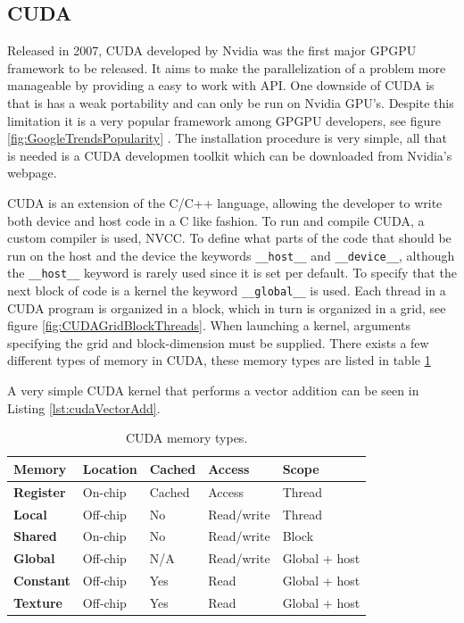 \subsection{CUDA}
Released in 2007, CUDA developed by Nvidia was the first major GPGPU framework to be released. It aims to make the parallelization of a problem more manageable by providing a easy to work with API. One downside of CUDA is that is has a weak portability and can only be run on Nvidia GPU's. Despite this limitation it is a very popular framework among GPGPU developers, see figure \ref{fig:GoogleTrendsPopularity} \cite{AboutCuda}.  The installation procedure is very simple, all that is needed is a CUDA developmen toolkit which can be downloaded from Nvidia's webpage.

CUDA is an extension of the C/C++ language, allowing the developer to write both device and host code in a C like fashion. To run and compile CUDA, a custom compiler is used, NVCC. To define what parts of the code that should be run on the host and the device the keywords \lstinline{__host__} and \lstinline{__device__}, although the \lstinline{__host__} keyword is rarely used since it is set per default. To specify that the next block of code is a kernel the keyword \lstinline{__global__} is used.
Each thread in a CUDA program is organized in a block, which in turn is organized in a grid, see figure \ref{fig:CUDAGridBlockThreads}. When launching a kernel, arguments specifying the grid and block-dimension must be supplied. There exists a few different types of memory in CUDA, these memory types are listed in table \ref{tab:CUDAMemoryTypes} 

A very simple CUDA kernel that performs a vector addition can be seen in Listing \ref{lst:cudaVectorAdd}.

\begin{table}

    \begin{tabularx}{\textwidth}{ |X|X|X|X|X| }
      \hline
      \textbf{Memory} &  \textbf{Location} &  \textbf{Cached} &    \textbf{Access} &    \textbf{Scope} \\ \hline 
      \textbf{Register} & On-chip   & Cached    & Access        & Thread \\ \hline 
      \textbf{Local}    & Off-chip  & No        & Read/write    & Thread \\ \hline 
      \textbf{Shared}   & On-chip   & No        & Read/write    & Block \\ \hline 
      \textbf{Global}   & Off-chip  & N/A       & Read/write    & Global + host \\ \hline 
      \textbf{Constant} & Off-chip  & Yes       & Read          & Global + host \\ \hline 
      \textbf{Texture}  & Off-chip  & Yes       & Read          & Global + host \\ \hline 
    \end{tabularx}

\caption{\label{tab:CUDAMemoryTypes} CUDA memory types.}
\end{table}

